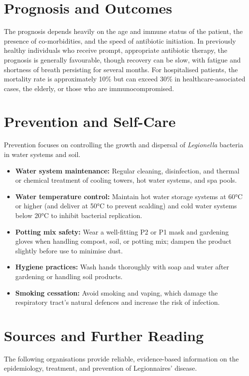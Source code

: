 \section*{Prognosis and Outcomes}
The prognosis depends heavily on the age and immune status of the patient, the presence of co-morbidities, and the speed of antibiotic initiation. In previously healthy individuals who receive prompt, appropriate antibiotic therapy, the prognosis is generally favourable, though recovery can be slow, with fatigue and shortness of breath persisting for several months. For hospitalised patients, the mortality rate is approximately 10\% but can exceed 30\% in healthcare-associated cases, the elderly, or those who are immunocompromised.

\section*{Prevention and Self-Care}
Prevention focuses on controlling the growth and dispersal of \textit{Legionella} bacteria in water systems and soil.

\begin{itemize}
    \item \textbf{Water system maintenance:} Regular cleaning, disinfection, and thermal or chemical treatment of cooling towers, hot water systems, and spa pools.
    \item \textbf{Water temperature control:} Maintain hot water storage systems at 60°C or higher (and deliver at 50°C to prevent scalding) and cold water systems below 20°C to inhibit bacterial replication.
    \item \textbf{Potting mix safety:} Wear a well-fitting P2 or P1 mask and gardening gloves when handling compost, soil, or potting mix; dampen the product slightly before use to minimise dust.
    \item \textbf{Hygiene practices:} Wash hands thoroughly with soap and water after gardening or handling soil products.
    \item \textbf{Smoking cessation:} Avoid smoking and vaping, which damage the respiratory tract's natural defences and increase the risk of infection.
\end{itemize}

\section*{Sources and Further Reading}
The following organisations provide reliable, evidence-based information on the epidemiology, treatment, and prevention of Legionnaires' disease.

